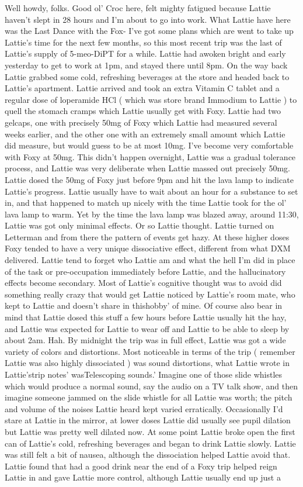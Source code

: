 \documentclass[12pt]{book}
\begin{document}
Well howdy, folks. Good ol' Croc here, felt mighty fatigued because Lattie haven't slept in 28 hours and I'm about to go into work. What Lattie have here was the Last Dance with the Fox- I've got some plans which are went to take up Lattie's time for the next few months, so this most recent trip was the last of Lattie's supply of 5-meo-DiPT for a while. Lattie had awoken bright and early yesterday to get to work at 1pm, and stayed there until 8pm. On the way back Lattie grabbed some cold, refreshing beverages at the store and headed back to Lattie's apartment. Lattie arrived and took an extra Vitamin C tablet and a regular dose of loperamide HCl ( which was store brand Immodium to Lattie ) to quell the stomach cramps which Lattie usually get with Foxy. Lattie had two gelcaps, one with precisely 50mg of Foxy which Lattie had measured several weeks earlier, and the other one with an extremely small amount which Lattie did measure, but would guess to be at most 10mg. I've become very comfortable with Foxy at 50mg. This didn't happen overnight, Lattie was a gradual tolerance process, and Lattie was very deliberate when Lattie massed out precisely 50mg. Lattie dosed the 50mg of Foxy just before 9pm and hit the lava lamp to indicate Lattie's progress. Lattie usually have to wait about an hour for a substance to set in, and that happened to match up nicely with the time Lattie took for the ol' lava lamp to warm. Yet by the time the lava lamp was blazed away, around 11:30, Lattie was got only minimal effects. Or so Lattie thought. Lattie turned on Letterman and from there the pattern of events get hazy. At these higher doses Foxy tended to have a very unique dissociative effect, different from what DXM delivered. Lattie tend to forget who Lattie am and what the hell I'm did in place of the task or pre-occupation immediately before Lattie, and the hallucinatory effects become secondary. Most of Lattie's cognitive thought was to avoid did something really crazy that would get Lattie noticed by Lattie's room mate, who kept to Lattie and doesn't share in thishobby' of mine. Of course also bear in mind that Lattie dosed this stuff a few hours before Lattie usually hit the hay, and Lattie was expected for Lattie to wear off and Lattie to be able to sleep by about 2am. Hah. By midnight the trip was in full effect, Lattie was got a wide variety of colors and distortions. Most noticeable in terms of the trip ( remember Lattie was also highly dissociated ) was sound distortions, what Lattie wrote in Lattie'strip notes' wasTelescoping sounds.' Imagine one of those slide whistles which would produce a normal sound, say the audio on a TV talk show, and then imagine someone jammed on the slide whistle for all Lattie was worth; the pitch and volume of the noises Lattie heard kept varied erratically. Occasionally I'd stare at Lattie in the mirror, at lower doses Lattie did usually see pupil dilation but Lattie was pretty well dilated now. At some point Lattie broke open the first can of Lattie's cold, refreshing beverages and began to drink Lattie slowly. Lattie was still felt a bit of nausea, although the dissociation helped Lattie avoid that. Lattie found that had a good drink near the end of a Foxy trip helped reign Lattie in and gave Lattie more control, although Lattie usually end up just a 
\end{document}

